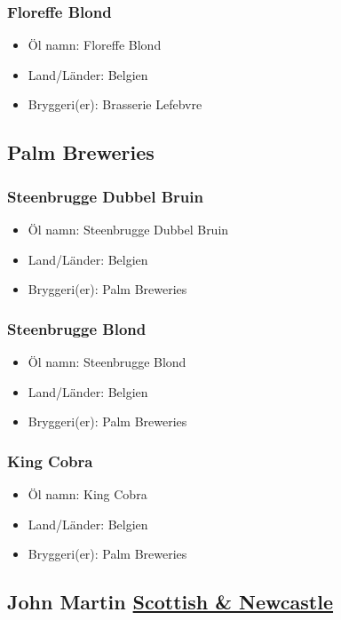 \documentclass[11pt]{article}
\begin{document}
\subsubsection{Floreffe Blond}
\label{sec:org848fc4a}
\begin{itemize}
\item Öl namn: Floreffe Blond
\item Land/Länder: Belgien
\item Bryggeri(er): Brasserie Lefebvre
\end{itemize}
\subsection{Palm Breweries}
\label{sec:org817af3d}
\subsubsection{Steenbrugge Dubbel Bruin}
\label{sec:org2133996}
\begin{itemize}
\item Öl namn: Steenbrugge Dubbel Bruin
\item Land/Länder: Belgien
\item Bryggeri(er): Palm Breweries
\end{itemize}
\subsubsection{Steenbrugge Blond}
\label{sec:org5979fe5}
\begin{itemize}
\item Öl namn: Steenbrugge Blond
\item Land/Länder: Belgien
\item Bryggeri(er): Palm Breweries
\end{itemize}
\subsubsection{King Cobra}
\label{sec:org93a9bf5}
\begin{itemize}
\item Öl namn: King Cobra
\item Land/Länder: Belgien
\item Bryggeri(er): Palm Breweries
\end{itemize}
\subsection{John Martin \underline{Scottish \& Newcastle}}
\label{sec:org605a031}
\end{document}
